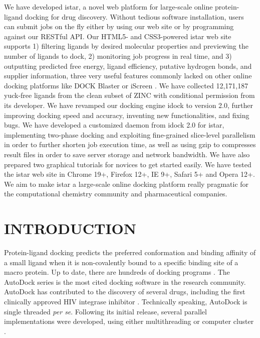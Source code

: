 \documentclass[12pt]{article}
\begin{document}
We have developed istar, a novel web platform for large-scale online protein-ligand docking for drug discovery. Without tedious software installation, users can submit jobs on the fly either by using our web site or by programming against our RESTful API. Our HTML5- and CSS3-powered istar web site supports 1) filtering ligands by desired molecular properties and previewing the number of ligands to dock, 2) monitoring job progress in real time, and 3) outputting predicted free energy, ligand efficiency, putative hydrogen bonds, and supplier information, three very useful features commonly lacked on other online docking platforms like DOCK Blaster \citep{557} or iScreen \citep{899}. We have collected 12,171,187 yuck-free ligands from the clean subset of ZINC \citep{532,1178} with conditional permission from its developer. We have revamped our docking engine idock \citep{1153} to version 2.0, further improving docking speed and accuracy, inventing new functionalities, and fixing bugs. We have developed a customized daemon from idock 2.0 for istar, implementing two-phase docking and exploiting fine-grained slice-level parallelism in order to further shorten job execution time, as well as using gzip to compresses result files in order to save server storage and network bandwidth. We have also prepared two graphical tutorials for novices to get started easily. We have tested the istar web site in Chrome 19+, Firefox 12+, IE 9+, Safari 5+ and Opera 12+. We aim to make istar a large-scale online docking platform really pragmatic for the computational chemistry community and pharmaceutical companies.

\section*{\sffamily \Large INTRODUCTION} %

Protein-ligand docking predicts the preferred conformation and binding affinity of a small ligand when it is non-covalently bound to a specific binding site of a macro protein. Up to date, there are hundreds of docking programs \citep{493,922}. The AutoDock series is the most cited docking software in the research community. AutoDock has contributed to the discovery of several drugs, including the first clinically approved HIV integrase inhibitor \citep{1169}. Technically speaking, AutoDock is single threaded \textit{per se}. Following its initial release, several parallel implementations were developed, using either multithreading or computer cluster \citep{115,560,782}.
\end{document}

